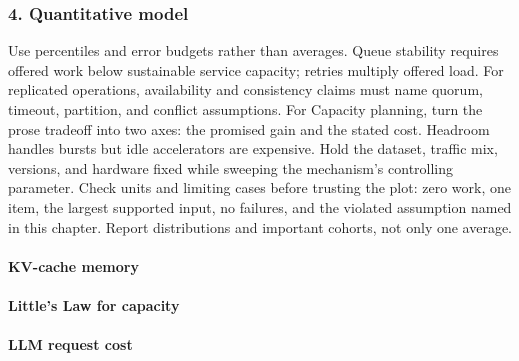 \subsubsection*{4. Quantitative model}
Use percentiles and error budgets rather than averages. Queue stability requires offered work below sustainable service capacity; retries multiply offered load. For replicated operations, availability and consistency claims must name quorum, timeout, partition, and conflict assumptions.
For Capacity planning, turn the prose tradeoff into two axes: the promised gain and the stated cost. Headroom handles bursts but idle accelerators are expensive. Hold the dataset, traffic mix, versions, and hardware fixed while sweeping the mechanism's controlling parameter.
Check units and limiting cases before trusting the plot: zero work, one item, the largest supported input, no failures, and the violated assumption named in this chapter. Report distributions and important cohorts, not only one average.
\paragraph{KV-cache memory}
\paragraph{Little's Law for capacity}
\paragraph{LLM request cost}
